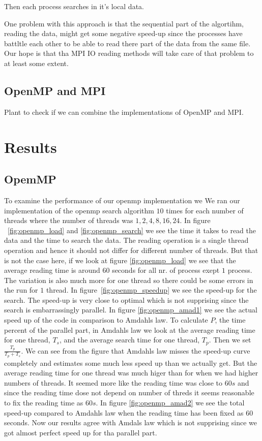 \documentclass[a4paper,10pt]{article}
\begin{document}
  Then each process searches in it's local data.

  One problem with this approach is that the sequential part of the algortihm, reading the data,
  might get some negative speed-up since the processes have battltle each other 
  to be able to read there part of the data from the same file.  Our hope is that
  tha MPI IO reading methods will take care of that problem to at least some extent.   
  

\subsection{OpenMP and MPI}
  Plant to check if we can combine the implementations of OpenMP and MPI.



\section{Results}

\subsection{OpemMP}
 
 To examine the performance of our openmp implementation we 
 We ran our implementation of the openmp search algorithm $10$ times for each number
 of threads where the number of threads was $1,2,4,8,16,24$.
 In figure ~\ref{fig:openmp_load} and \ref{fig:openmp_search} we see the
 time it takes to read the data and the time to search the data.
 The reading operation is a single thread operation and hence it should not differ for 
 different number of threads.  But that is not the case here, if we look at figure \ref{fig:openmp_load}
 we see that the average reading time is around $60$ seconds for all nr. of process exept
 $1$ process.  The variation is also much more for one thread so there could be some 
 errors in the run for $1$ thread. 
 In figure~\ref{fig:openmp_speedup} we see the speed-up for the search. 
 The speed-up is very close to optimal which is not supprising since the search is embarrassingly
 parallel.
 In figure \ref{fig:openmp_amad1} we see the actual speed up of the code in comparison to Amdahls law.
 To calculate $P$, the time percent of the parallel part, in Amdahls law we look at the
 average reading time for one thread, $T_s$, and the average search time for one thread, $T_p$.
 Then we set $\frac{T_p}{T_p+T_s}$.  We can see from the figure that Amdahls law misses the speed-up 
 curve completely and estimates some much less speed up than we actually get.
 But the average reading time for one thread was much higer than for when we had higher numbers of 
 threads.  It seemed more like the reading time was close to $60s$ and since the reading
 time dose not depend on number of threds it seems reasonable to fix the reading time as $60s$.
 In figure \ref{fig:openmp_amad2} we see the total speed-up compared to Amdahls law
 when the reading time has been fixed as $60$ seconds.  Now our results agree with Amdals law
 which is not supprising since we got almost perfect speed up for tha parallel part.
\end{document}
